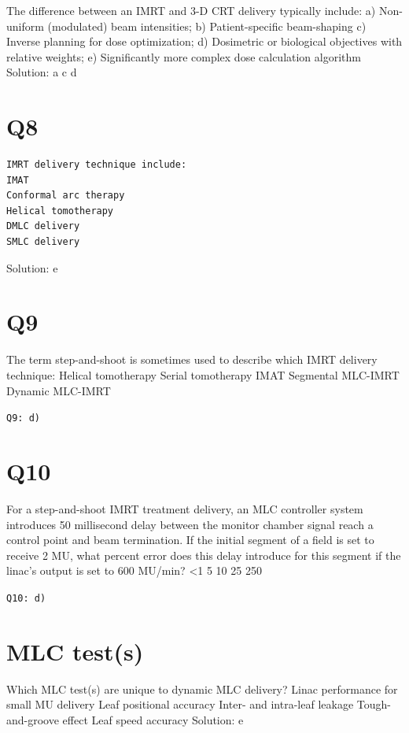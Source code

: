 \documentclass[]{book}
\theoremstyle{definition}
\theoremstyle{definition}
\theoremstyle{definition}
\theoremstyle{remark}
\begin{document}
The difference between an IMRT and 3-D CRT delivery typically include:
a) Non-uniform (modulated) beam intensities; b) Patient-specific
beam-shaping c) Inverse planning for dose optimization; d) Dosimetric or
biological objectives with relative weights; e) Significantly more
complex dose calculation algorithm Solution: a c d

\section{Q8}\label{q8}

\begin{verbatim}
IMRT delivery technique include:
IMAT
Conformal arc therapy
Helical tomotherapy
DMLC delivery
SMLC delivery
\end{verbatim}

Solution: e

\section{Q9}\label{q9}

The term step-and-shoot is sometimes used to describe which IMRT
delivery technique: Helical tomotherapy Serial tomotherapy IMAT
Segmental MLC-IMRT Dynamic MLC-IMRT

\texttt{Q9:\ d)}

\section{Q10}\label{q10}

For a step-and-shoot IMRT treatment delivery, an MLC controller system
introduces 50 millisecond delay between the monitor chamber signal reach
a control point and beam termination. If the initial segment of a field
is set to receive 2 MU, what percent error does this delay introduce for
this segment if the linac's output is set to 600 MU/min? \textless{}1 5
10 25 250

\texttt{Q10:\ d)}

\section{MLC test(s)}\label{mlc-tests}

Which MLC test(s) are unique to dynamic MLC delivery? Linac performance
for small MU delivery Leaf positional accuracy Inter- and intra-leaf
leakage Tough-and-groove effect Leaf speed accuracy Solution: e
\end{document}
